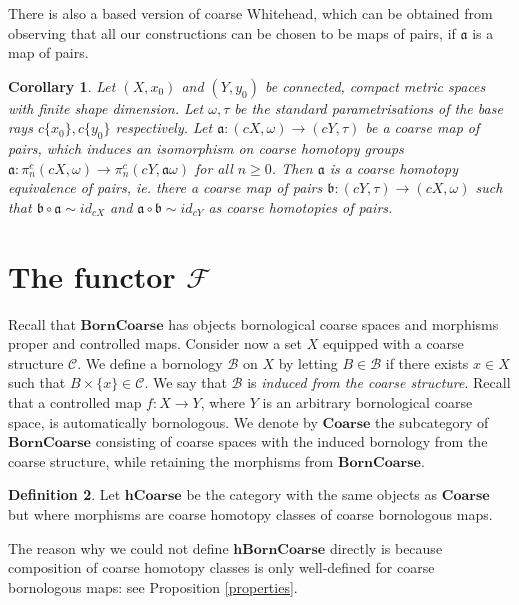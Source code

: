 \documentclass[a4paper,11pt]{article}
\theoremstyle{definition}
\newtheorem{definition}{Definition}[section]
\theoremstyle{plain}
\newtheorem{cor}[definition]{Corollary}
\theoremstyle{remark}
\begin{document}
{There is also a based version of coarse Whitehead, which can be obtained from observing that all our constructions can be chosen to be maps of pairs, if $\mathfrak{a}$ is a map of pairs.

\begin{cor} \label{basedwhitehead} Let $(X,x_0)$ and $(Y,y_0)$ be connected, compact metric spaces with finite shape dimension. Let $\omega,\tau$ be the standard parametrisations of the base rays $c\{x_0\}, c\{y_0\}$ respectively. Let $\mathfrak{a}:(cX,\omega)\rightarrow (cY,\tau)$ be a coarse map of pairs, which induces an isomorphism on coarse homotopy groups $\mathfrak{a}: \pi_{n}^{c}(cX,\omega)\rightarrow \pi_{n}^{c}(cY,\mathfrak{a}\omega)$ for all $n\geq 0$. Then $\mathfrak{a}$ is a coarse homotopy equivalence of pairs, ie. there a coarse map of pairs $\mathfrak{b}: (cY, \tau)\rightarrow (cX,\omega)$ such that $\mathfrak{b}\circ \mathfrak{a} \sim id_{cX}$ and $\mathfrak{a}\circ \mathfrak{b} \sim id_{cY}$ as coarse homotopies of pairs.
\end{cor}

\newpage

\section{The functor $\mathcal{F}$} 

Recall that $\mathbf{BornCoarse}$ has objects bornological coarse spaces and morphisms proper and controlled maps. Consider now a set $X$ equipped with a coarse structure $\mathcal{C}$. We define a bornology $\mathcal{B}$ on $X$ by letting $B\in \mathcal{B}$ if there exists $x\in X$ such that $B\times \{x\}\in \mathcal{C}$. We say that $\mathcal{B}$ is \textit{induced from the coarse structure}. Recall that a controlled map $f:X\rightarrow Y$, where $Y$ is an arbitrary bornological coarse space, is automatically bornologous. We denote by $\textbf{Coarse}$ the subcategory of $\textbf{BornCoarse}$ consisting of coarse spaces with the induced bornology from the coarse structure, while retaining the morphisms from $\textbf{BornCoarse}$.

\begin{definition} Let $\mathbf{hCoarse}$ be the category with the same objects as $\mathbf{Coarse}$ but where morphisms are coarse homotopy classes of coarse bornologous maps. 
\end{definition}

The reason why we could not define $\mathbf{hBornCoarse}$ directly is because composition of coarse homotopy classes is only well-defined for coarse bornologous maps: see Proposition \ref{properties}. 

}
\end{document}
